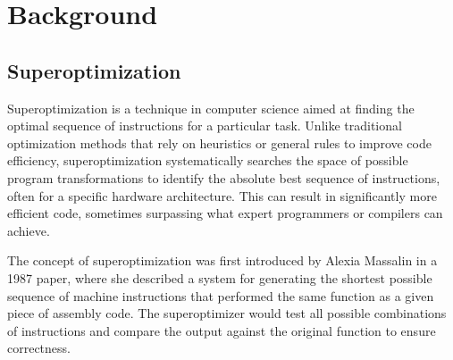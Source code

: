 
\chapter{Background}



\section{Superoptimization}


Superoptimization is a technique in computer science aimed at finding
the optimal sequence of instructions for a particular task. Unlike
traditional optimization methods that rely on heuristics or general
rules to improve code efficiency, superoptimization systematically
searches the space of possible program transformations to identify the
absolute best sequence of instructions, often for a specific hardware
architecture. This can result in significantly more efficient code,
sometimes surpassing what expert programmers or compilers can achieve.


The concept of superoptimization was first introduced by Alexia
Massalin in a 1987 paper, where she described a system for generating
the shortest possible sequence of machine instructions that performed
the same function as a given piece of assembly code. The
superoptimizer would test all possible combinations of instructions
and compare the output against the original function to ensure
correctness.




